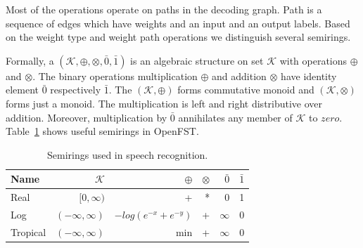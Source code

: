 Most of the operations operate on paths in the decoding graph.
Path is a sequence of edges which have weights and an input and an output labels.
Based on the weight type and weight path operations we distinguish several semirings. 

Formally, a  $(\mathcal{K}, \oplus, \otimes, \bar{0}, \bar{1})$ is an algebraic structure on set $\mathcal{K}$ with operations $\oplus$ and $\otimes$.
The binary operations multiplication $\oplus$ and addition $\otimes$ have identity element $\bar{0}$ respectively $\bar{1}$. 
The $(\mathcal{K}, \oplus)$ forms commutative monoid and $(\mathcal{K}, \otimes)$ forms just a monoid.
The multiplication is left and right distributive over addition.
Moreover, multiplication by $\bar{0}$ annihilates any member of $\mathcal{K}$ to $zero$. 
Table~\ref{tab:semiring} shows useful semirings in OpenFST.

\begin{table}[!htp]\label{tab:semiring}
\begin{center}
\begin{tabular}{lrrrrr}
\hline
Name & $\mathcal{K}$ & $\oplus$ & $ \otimes$ & $\bar{0}$ & $\bar{1}$ \\ 
\hline
Real        & $[0,\infty)$        &  +                     &  * &  0        &  1  \\
Log         & $(-\infty, \infty)$ & $-log(e^{-x} + e^{-y})$ & + &  $\infty$ &  0  \\
Tropical    & $(-\infty, \infty)$ &  min                   &  + &  $\infty$ &  0  \\
\hline
\end{tabular}
\caption{Semirings used in speech recognition.\cite{openfst_web}}
\end{center}
\end{table}
